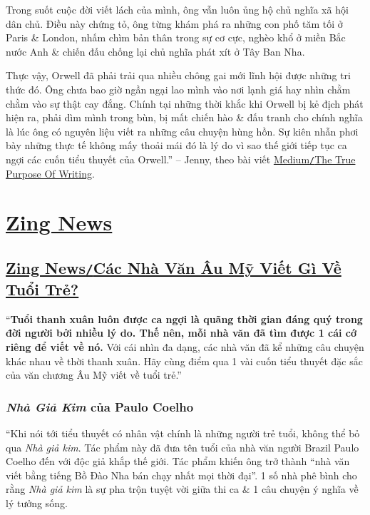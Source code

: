 \documentclass[oneside]{book}
\numberwithin{equation}{section}
\begin{document}
Trong suốt cuộc đời viết lách của mình, ông vẫn luôn ủng hộ chủ nghĩa xã hội dân chủ. Điều này chứng tỏ, ông từng khám phá ra những con phố tăm tối ở Paris \& London, nhấm chìm bản thân trong sự cơ cực, nghèo khổ ở miền Bắc nước Anh \& chiến đấu chống lại chủ nghĩa phát xít ở Tây Ban Nha.

Thực vậy, Orwell đã phải trải qua nhiều chông gai mới lĩnh hội được những tri thức đó. Ông chưa bao giờ ngần ngại lao mình vào nơi lạnh giá hay nhìn chằm chằm vào sự thật cay đắng. Chính tại những thời khắc khi Orwell bị kẻ địch phát hiện ra, phải dìm mình trong bùn, bị mất chiến hào \& đấu tranh cho chính nghĩa là lúc ông có nguyên liệu viết ra những câu chuyện hùng hồn. Sự kiên nhẫn phơi bày những thực tế không mấy thoải mái đó là lý do vì sao thế giới tiếp tục ca ngợi các cuốn tiểu thuyết của Orwell.'' -- Jenny, theo bài viết \href{https://medium.com/personal-growth/george-orwell-why-your-writing-must-have-purpose-77a3e94d6692}{Medium\texttt{/}The True Purpose Of Writing}.


\chapter{\href{https://zingnews.vn}{Zing News}}

\section{\href{https://zingnews.vn/cac-nha-van-au-my-viet-gi-ve-tuoi-tre-post1170767.html}{Zing News\texttt{/}Các Nhà Văn Âu Mỹ Viết Gì Về Tuổi Trẻ?}}
``\textbf{Tuổi thanh xuân luôn được ca ngợi là quãng thời gian đáng quý trong đời người bởi nhiều lý do. Thế nên, mỗi nhà văn đã tìm được 1 cái cớ riêng để viết về nó.} Với cái nhìn đa dạng, các nhà văn đã kể những câu chuyện khác nhau về thời thanh xuân. Hãy cùng điểm qua 1 vài cuốn tiểu thuyết đặc sắc của văn chương Âu Mỹ viết về tuổi trẻ.''

\subsection{\textit{Nhà Giả Kim} của Paulo Coelho}
``Khi nói tới tiểu thuyết có nhân vật chính là những người trẻ tuổi, không thể bỏ qua \textit{Nhà giả kim}. Tác phẩm này đã đưa tên tuổi của nhà văn người Brazil Paulo Coelho đến với độc giả khắp thế giới. Tác phẩm khiến ông trở thành ``nhà văn viết bằng tiếng Bồ Đào Nha bán chạy nhất mọi thời đại''. 1 số nhà phê bình cho rằng \textit{Nhà giả kim} là sự pha trộn tuyệt vời giữa thi ca \& 1 câu chuyện ý nghĩa về lý tưởng sống.
\end{document}
